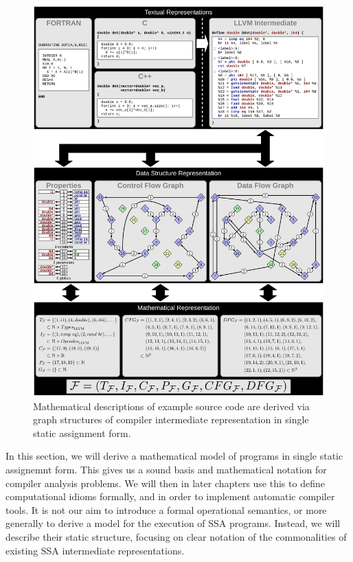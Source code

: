 \begin{figure}[p]
\centering
\includegraphics[width=\textwidth,height=1.5\textwidth]{figures/schaubild.pdf}

\vspace{9.31595pt}
\caption{Mathematical descriptions of example source code are derived via graph
         structures of compiler intermediate representation in single static
         assignment form.}
\label{fig:derivemaths}
\end{figure}

    In this section, we will derive a mathematical model of programs in single
    static assignemnt form.
    This gives us a sound basis and mathematical notation for compiler
    analysis problems.
    We will then in later chapters use this to define computational idioms
    formally, and in order to implement automatic compiler tools.
    It is not our aim to introduce a formal operational semantics, or more
    generally to derive a model for the execution of SSA programs.
    Instead, we will describe their static structure, focusing on clear notation
    of the commonalities of existing SSA intermediate representations.

